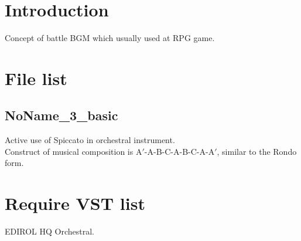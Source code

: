 \documentclass{article}
\author{Seycho Han}
\date{XX XX 2022}
\begin{document}
\begin{CJK}{UTF8}{ipxm}

\section{Introduction}
Concept of battle BGM which usually used at RPG game.
\\
\section{File list}
\subsection{NoName\_3\_basic}
Active use of Spiccato in orchestral instrument.\\
Construct of musical composition  is A$'$-A-B-C-A-B-C-A-A$'$, similar to the Rondo form.
\\

\section{Require VST list}
EDIROL HQ Orchestral\cite{edirol}.
\\




\end{CJK}
\end{document}
